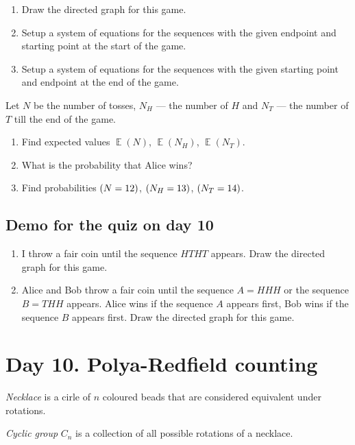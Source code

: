 \documentclass[12pt]{article}
\let\P\relax
\DeclareMathOperator{\P}{\mathbb{P}}
\DeclareMathOperator{\E}{\mathbb{E}}
\begin{document}
\begin{enumerate}
\begin{enumerate}[label=\alph*)]
    \item Draw the directed graph for this game.
    \item Setup a system of equations for the sequences with the given endpoint and starting point at the start of the game. 
    \item Setup a system of equations for the sequences with the given starting point and endpoint at the end of the game. 
\end{enumerate}
Let $N$ be the number of tosses, $N_H$ — the number of $H$ and $N_T$ — the number of $T$ till the end of the game. 
\begin{enumerate}[label=\alph*), resume]
    \item Find expected values $\E(N)$, $\E(N_H)$, $\E(N_T)$.
    \item What is the probability that Alice wins?
    \item Find probabilities $\P(N = 12)$, $\P(N_H = 13)$, $\P(N_T = 14)$.
\end{enumerate}


\end{enumerate}

\subsection*{Demo for the quiz on day 10}

\begin{enumerate} 
    \item I throw a fair coin until the sequence $HTHT$ appears. 
    Draw the directed graph for this game.
    \item Alice and Bob throw a fair coin until the sequence $A = HHH$ or the sequence $B = THH$ appears.
Alice wins if the sequence $A$ appears first, Bob wins if the sequence $B$ appears first.
 Draw the directed graph for this game.
\end{enumerate}


\section{Day 10. Polya-Redfield counting}

\begin{definition}
    \emph{Necklace} is a cirle of $n$ coloured beads that are considered equivalent under rotations. 

    \emph{Cyclic group} $C_n$ is a collection of all possible rotations of a necklace. 
\end{definition}
\end{document}
